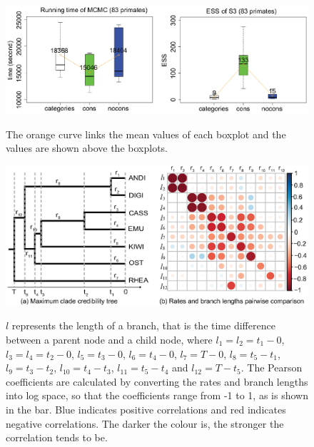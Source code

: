 \documentclass{bmcart}
\begin{document}
\begin{backmatter}
\begin{figure}[h!]
\includegraphics[width=12cm]{Fig15-primates.eps}\\
\caption{
             The orange curve links the mean values of each boxplot and the values are shown above the boxplots.}
\label{eff_comp2}
\end{figure}

\begin{figure}[h!]
\includegraphics[width=12cm]{Fig16-correlation.eps}\\
\caption{
             $l$ represents the length of a branch, that is the time difference between a parent node and a child node, where ${l_1} = {l_2} =  {t_1} - 0$, ${l_3} = {l_4} = {t_2} - 0$, ${l_5} = {t_3} - 0$, ${l_6} = {t_4} - 0$, ${l_7} = T - 0$, ${l_8} = {t_5} - {t_1}$, ${l_9} = {t_3} - {t_2}$, ${l_{10}} = {t_4} - {t_3}$, ${l_{11}} = {t_5} - {t_4}$ and ${l_{12}} = T - {t_5}$. The Pearson coefficients are calculated by converting the rates and branch lengths into log space, so that the coefficients range from -1 to 1, as is shown in the bar. Blue indicates positive correlations and red indicates negative correlations. The darker the colour is, the stronger the correlation tends to be. }
\label{correlation}
\end{figure}


\end{backmatter}
\end{document}
